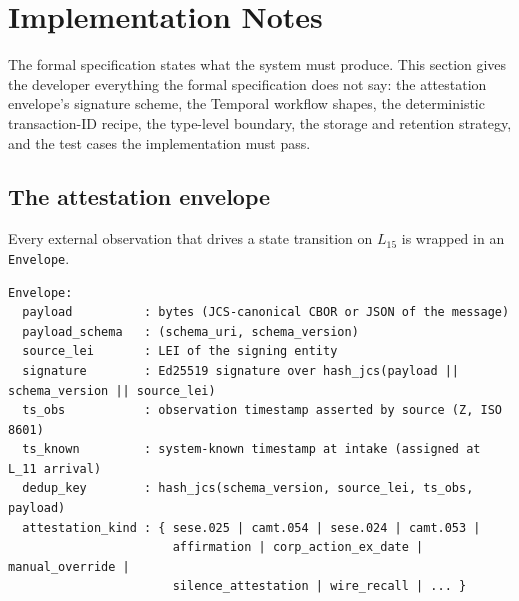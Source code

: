 \documentclass[11pt,a4paper]{article}
\begin{document}
\clearpage
\section{Implementation Notes}
\label{sec:implementation}

The formal specification states what the system must produce. This section gives the developer everything the formal specification does not say: the attestation envelope's signature scheme, the Temporal workflow shapes, the deterministic transaction-ID recipe, the type-level boundary, the storage and retention strategy, and the test cases the implementation must pass.

\subsection{The attestation envelope}
\label{sec:envelope}

Every external observation that drives a state transition on $L_{15}$ is wrapped in an \texttt{Envelope}.

\begin{lstlisting}
Envelope:
  payload          : bytes (JCS-canonical CBOR or JSON of the message)
  payload_schema   : (schema_uri, schema_version)
  source_lei       : LEI of the signing entity
  signature        : Ed25519 signature over hash_jcs(payload || schema_version || source_lei)
  ts_obs           : observation timestamp asserted by source (Z, ISO 8601)
  ts_known         : system-known timestamp at intake (assigned at L_11 arrival)
  dedup_key        : hash_jcs(schema_version, source_lei, ts_obs, payload)
  attestation_kind : { sese.025 | camt.054 | sese.024 | camt.053 |
                       affirmation | corp_action_ex_date | manual_override |
                       silence_attestation | wire_recall | ... }
\end{lstlisting}
\end{document}
